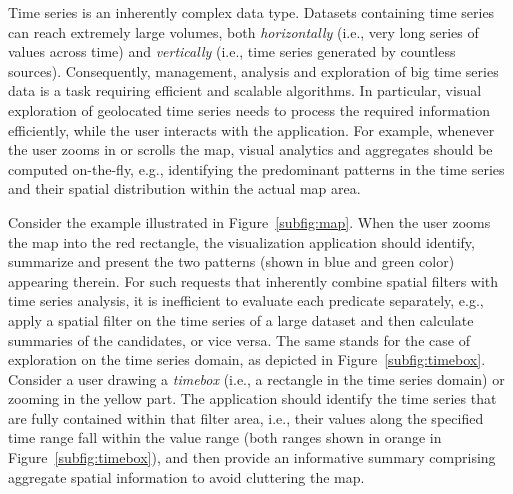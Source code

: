 
\graphicspath{{Papers/ElsevierBigDataResearch/}}

Time series is an inherently complex data type. Datasets containing time series can reach extremely large volumes, both {\em horizontally} (i.e., very long series of values across time) and {\em vertically} (i.e., time series generated by countless sources). Consequently, management, analysis and exploration of big time series data is a task requiring efficient and scalable algorithms. In particular, visual exploration of geolocated time series needs to process the required information efficiently, while the user interacts with the application. For example, whenever the user zooms in or scrolls the map, visual analytics and aggregates should be computed on-the-fly, e.g., identifying the predominant patterns in the time series and their spatial distribution within the actual map area.

Consider the example illustrated in Figure~\ref{subfig:map}. When the user zooms the map into the red rectangle, the visualization application should identify, summarize and present the two patterns (shown in blue and green color) appearing therein. For such requests that inherently combine spatial filters with time series analysis, it is inefficient to evaluate each predicate separately, e.g., apply a spatial filter on the time series of a large dataset and then calculate summaries of the candidates, or vice versa. The same stands for the case of exploration on the time series domain, as depicted in Figure~\ref{subfig:timebox}. Consider a user drawing a {\em timebox} (i.e., a rectangle in the time series domain) or zooming in the yellow part. The application should identify the time series that are fully contained within that filter area, i.e., their values along the specified time range fall within the value range (both ranges shown in orange in Figure~\ref{subfig:timebox}), and then provide an informative summary comprising aggregate spatial information to avoid cluttering the map.

